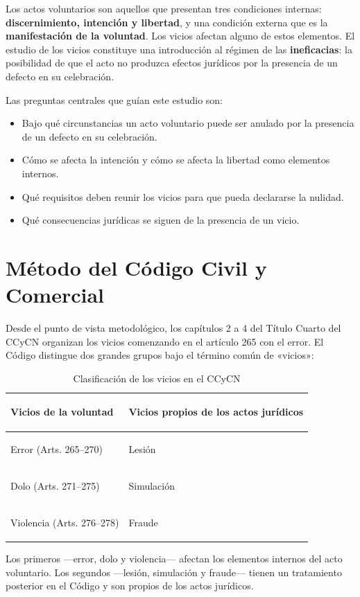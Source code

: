 \documentclass[12pt,oneside]{book}
\begin{document}
Los actos voluntarios son aquellos que presentan tres condiciones internas: \textbf{discernimiento, intención y libertad}, y una condición externa que es la \textbf{manifestación de la voluntad}. Los vicios afectan alguno de estos elementos. El estudio de los vicios constituye una introducción al régimen de las \textbf{ineficacias}: la posibilidad de que el acto no produzca efectos jurídicos por la presencia de un defecto en su celebración.

Las preguntas centrales que guían este estudio son:
\begin{itemize}
    \item Bajo qué circunstancias un acto voluntario puede ser anulado por la presencia de un defecto en su celebración.
    \item Cómo se afecta la intención y cómo se afecta la libertad como elementos internos.
    \item Qué requisitos deben reunir los vicios para que pueda declararse la nulidad.
    \item Qué consecuencias jurídicas se siguen de la presencia de un vicio.
\end{itemize}

\section{Método del Código Civil y Comercial}

Desde el punto de vista metodológico, los capítulos 2 a 4 del Título Cuarto del CCyCN organizan los vicios comenzando en el artículo 265 con el error. El Código distingue dos grandes grupos bajo el término común de «vicios»:

\begin{table}[H]
\centering
\begin{tabularx}{\textwidth}{>{\bfseries\raggedright\arraybackslash}X >{\raggedright\arraybackslash}X}
\toprule
\textbf{Vicios de la voluntad} & \textbf{Vicios propios de los actos jurídicos} \\
\midrule
Error (Arts. 265--270) & Lesión \\
Dolo (Arts. 271--275) & Simulación \\
Violencia (Arts. 276--278) & Fraude \\
\bottomrule
\end{tabularx}
\caption{Clasificación de los vicios en el CCyCN}
\end{table}

Los primeros ---error, dolo y violencia--- afectan los elementos internos del acto voluntario. Los segundos ---lesión, simulación y fraude--- tienen un tratamiento posterior en el Código y son propios de los actos jurídicos.
\end{document}
